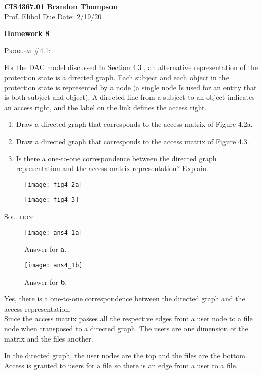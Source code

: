 \documentclass[12pt]{article}
\newenvironment{problem}[1]
{\begin{mdframed}[linewidth=0.8pt]
        \textsc{Problem #1:}

}
    {\end{mdframed}}
\newenvironment{solution}
    {\textsc{Solution:}\\}
    {\newpage}%
\begin{document}
\noindent
\textbf{CIS4367.01} \hfill \textbf{Brandon Thompson} \\
\normalsize Prof. Elibol \hfill Due Date: 2/19/20 \\

\begin{center}
\textbf{Homework 8}
\end{center}
	\begin{problem}{\#4.1}
		For the DAC model discussed In Section 4.3 , an alternative representation
		of the protection state is a directed graph. Each subject and each object
		in the protection state is represented by a node (a single node Is used for
		an entity that is both subject and object). A directed line from a subject
		to an object indicates an access right, and the label on the link defines
		the access right.
		\begin{enumerate}[label=\alph*]
			\item Draw a directed graph that corresponds to the access matrix
				of Figure 4.2a.
			\item Draw a directed graph that corresponds to the access matrix
				of Figure 4.3.
			\item Is there a one-to-one correspondence between the directed graph
				representation and the access matrix representation? Explain.
		\end{enumerate}
	\end{problem}
	\begin{figure}[ht!]
		\centering
		\texttt{[image: fig4\_2a]}
	\end{figure}
	\begin{figure}[ht!]
		\centering
		\texttt{[image: fig4\_3]}
	\end{figure}
	\vspace{20em}
	\begin{solution}
		\begin{figure}[h!]
			\centering
			\texttt{[image: ans4\_1a]}
			\caption{Answer for \textbf{a}.}
		\end{figure}
		\begin{figure}[ht!]
			\centering
			\texttt{[image: ans4\_1b]}
			\caption{Answer for \textbf{b}.}
			\label{fig:ans4_1b}
		\end{figure}
		Yes, there is a one-to-one correspondence between the directed graph and the
		access representation.\\

		Since the access matrix passes all the respective edges from a user node to a file
		node when transposed to a directed graph. The users are one dimension of the matrix
		and the files another.

		In the directed graph, the user nodes are the top and the files are the bottom.
		Access is granted to users for a file so there is an edge from a user to a file.
	\end{solution}
\end{document}
